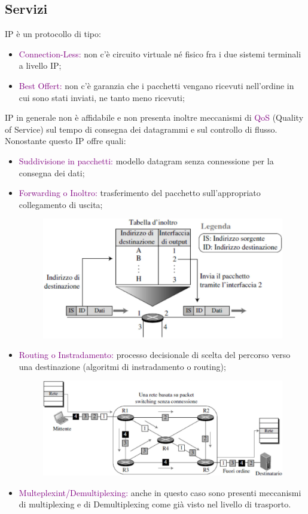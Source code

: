 \subsection{Servizi}
IP è un protocollo di tipo:
\begin{itemize}
    \item \textcolor{purple}{Connection-Less:} non c’è circuito virtuale né fisico fra i due sistemi terminali a livello IP;
    \item \textcolor{purple}{Best Offert:} non c’è garanzia che i pacchetti vengano ricevuti nell’ordine in cui sono stati inviati, ne tanto meno ricevuti;
\end{itemize}
IP in generale non è affidabile e non presenta inoltre meccanismi di \textcolor{purple}{QoS} (Quality of Service) sul tempo di consegna dei datagrammi e sul controllo di flusso.
\newpage
Nonostante questo IP offre quali:
\begin{itemize}
    \item \textcolor{purple}{Suddivisione in pacchetti:} modello datagram senza connessione per la consegna dei dati;
    \item \textcolor{purple}{Forwarding o Inoltro:} trasferimento del pacchetto sull’appropriato collegamento di uscita;
    \begin{figure}[h]
        \centering
        \includegraphics[scale=0.28]{Immagini/IndirizzamentoIP.png}
    \end{figure}
    \item \textcolor{purple}{Routing o Instradamento:} processo decisionale di scelta del percorso verso una destinazione (algoritmi di instradamento o routing);
    \begin{figure}[h]
        \centering
        \includegraphics[scale=0.28]{Immagini/ForwardingIP.png}
    \end{figure}
    \item \textcolor{purple}{Multeplexint/Demultiplexing:} anche in questo caso sono presenti meccanismi di multiplexing e di Demultiplexing come già visto nel livello di trasporto.
\end{itemize}

